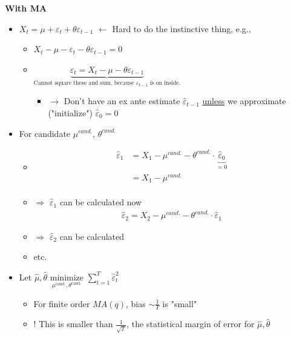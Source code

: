 \textbf{With MA}
\begin{itemize}
    \item $X_t=\mu+\varepsilon_t+\theta\varepsilon_{t-1}$ $\leftarrow$ Hard to do the instinctive thing, e.g.,
    \begin{itemize}
        \item[] $X_t-\mu-\varepsilon_t-\theta\varepsilon_{t-1}=0$
        \item[] $\underbrace{\varepsilon_t=X_t-\mu-\theta\varepsilon_{t-1}}_\text{Cannot square these and sum, because $\varepsilon_{t-1}$ is on inside.}$
        \begin{itemize}
            \item[] $\rightarrow$ Don't have an ex ante estimate $\hat{\varepsilon}_{t-1}$ \underline{unless} we approximate ("initialize") $\hat{\varepsilon}_0=0$
        \end{itemize}
    \end{itemize}
    \item For candidate $\mu^{\textit{cand.}}$, $\theta^{\textit{cand.}}$
    \begin{itemize}
        \item[]
        \begin{align*}
            \hat{\varepsilon}_1&=X_1-\mu^{\textit{cand.}}-\theta^{\textit{cand.}}\cdot \underbrace{\hat{\varepsilon}_0}_{=0}\\
            &=X_1-\mu^{\textit{cand.}}\\
        \end{align*}
        \item[]$\Rightarrow$ $\hat{\varepsilon}_1$ can be calculated now
        \begin{align*}
            \hat{\varepsilon}_2=X_2-\mu^{\textit{cand.}}-\theta^{\textit{cand.}} \cdot \hat{\varepsilon}_1
        \end{align*}
        \item[]$\Rightarrow$ $\hat{\varepsilon}_2$ can be calculated 
        \item[] etc.
    \end{itemize}
    \item[] Let $\hat{\mu}, \hat{\theta}$ $\underset{\mu^{\text{cand.}},\theta^{\text{cand.}}}{\text{minimize}}$ $\sum_{t=1}^T \hat{\varepsilon}_t^2$
    \begin{itemize}
        \item[] For finite order $MA(q)$, bias $\sim \frac{1}{T}$ is "small"
        \item[] ! This is smaller than $\frac{1}{\sqrt{T}}$, the statistical margin of error for $\hat{\mu}, \hat{\theta}$
    \end{itemize}
\end{itemize}


